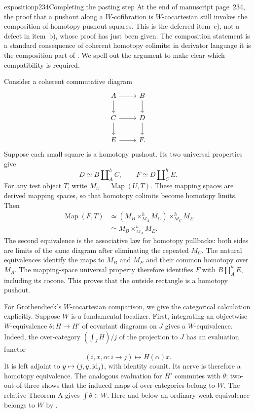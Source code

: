 \begin{dcomment}{exposition}{p234}{Completing the pasting step}
At the end of manuscript page~234, the proof that a pushout along a $W$-cofibration is $W$-cocartesian still invokes the composition of homotopy pushout squares. This is the deferred item~c), not a defect in item~b), whose proof has just been given. The composition statement is a standard consequence of coherent homotopy colimits; in derivator language it is the composition part of \citet[Proposition 3.13, published version]{Groth2013}. We spell out the argument to make clear which compatibility is required.

Consider a coherent commutative diagram
\[
\begin{tikzcd}
 A\arrow[r]\arrow[d]&B\arrow[d]\\
 C\arrow[r]\arrow[d]&D\arrow[d]\\
 E\arrow[r]&F .
\end{tikzcd}
\]
Suppose each small square is a homotopy pushout. Its two universal properties give
\[
 D\simeq B\amalg_A^{h}C,\qquad
 F\simeq D\amalg_C^{h}E.
\]
For any test object $T$, write $M_U=\operatorname{Map}(U,T)$. These mapping spaces are derived mapping spaces, so that homotopy colimits become homotopy limits. Then
\[
\begin{aligned}
 \operatorname{Map}(F,T)
 &\simeq (M_B\times^h_{M_A}M_C)\times^h_{M_C}M_E\\
 &\simeq M_B\times^h_{M_A}M_E.
\end{aligned}
\]
The second equivalence is the associative law for homotopy pullbacks: both sides are limits of the same diagram after eliminating the repeated $M_C$. The natural equivalences identify the maps to $M_B$ and $M_E$ and their common homotopy over $M_A$. The mapping-space universal property therefore identifies $F$ with $B\amalg_A^h E$, including its cocone. This proves that the outside rectangle is a homotopy pushout.

For Grothendieck's $W$-cocartesian comparison, we give the categorical calculation explicitly. Suppose $W$ is a fundamental localizer. First, integrating an objectwise $W$-equivalence $\theta:H\to H'$ of covariant diagrams on $J$ gives a $W$-equivalence. Indeed, the over-category $(\int_J H)/j$ of the projection to $J$ has an evaluation functor
\[
 (i,x,\alpha:i\to j)\longmapsto H(\alpha)x.
\]
It is left adjoint to $y\mapsto(j,y,\mathrm{id}_j)$, with identity counit. Its nerve is therefore a homotopy equivalence. The analogous evaluation for $H'$ commutes with $\theta$; two-out-of-three shows that the induced maps of over-categories belong to $W$. The relative Theorem A gives $\int\theta\in W$. Here and below an ordinary weak equivalence belongs to $W$ by \citet[Theorem 2.2.11]{Cisinski2004Minimal}.


\end{dcomment}
